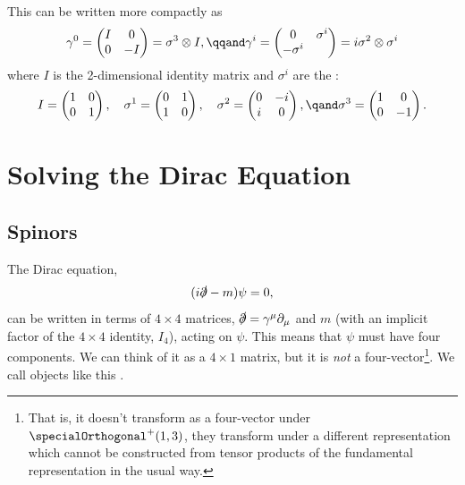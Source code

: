 \documentclass[fleqn]{NotesClass}
\begin{document}
    This can be written more compactly as
    \begin{equation}
        \gamma^0 = 
        \begin{pmatrix}
            I & 0\\
            0 & -I
        \end{pmatrix}
        = \sigma^3 \otimes I, \qqand \gamma^i =
        \begin{pmatrix}
            0 & \sigma^i\\
            -\sigma^i
        \end{pmatrix}
        = i\sigma^2 \otimes \sigma^i
    \end{equation}
    where \(I\) is the 2-dimensional identity matrix and \(\sigma^i\) are the :
    \begin{equation}
        I = 
        \begin{pmatrix}
            1 & 0 \\
            0 & 1
        \end{pmatrix}
        , \quad \sigma^1 = 
        \begin{pmatrix}
            0 & 1\\
            1 & 0
        \end{pmatrix}
        , \quad \sigma^2 = 
        \begin{pmatrix}
            0 & -i\\
            i & 0
        \end{pmatrix}
        , \qand \sigma^3 = 
        \begin{pmatrix}
            1 & 0\\
            0 & -1
        \end{pmatrix}
        .
    \end{equation}
    
    \chapter{Solving the Dirac Equation}
    \section{Spinors}
    The Dirac equation,
    \begin{equation}
        (i\slashed{\partial} - m)\psi = 0,
    \end{equation}
    can be written in terms of \(4\times 4\) matrices, \(\slashed{\partial} = \gamma^\mu\partial_\mu\) and \(m\) (with an implicit factor of the \(4\times 4\) identity, \(I_4\)), acting on \(\psi\).
    This means that \(\psi\) must have four components.
    We can think of it as a \(4 \times 1\) matrix, but it is \emph{not} a four-vector\footnote{That is, it doesn't transform as a four-vector under \(\specialOrthogonal^+(1,3)\), they transform under a different representation which cannot be constructed from tensor products of the fundamental representation in the usual way.}.
    We call objects like this .
    
\end{document}
